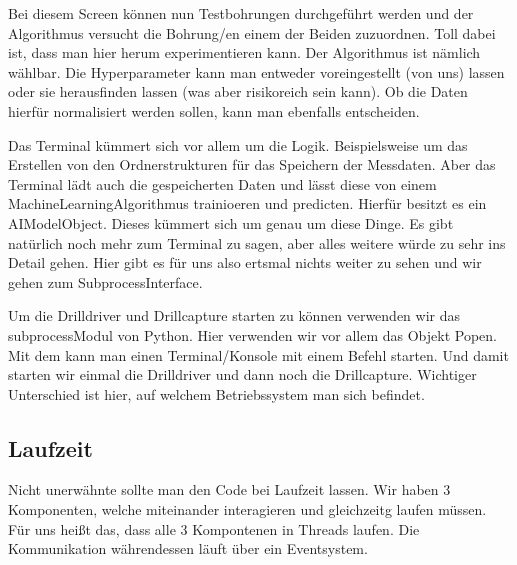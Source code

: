 \documentclass[letterpaper,10pt,english]{sphinxmanual}
\let\sphinxpxdimen\pdfpxdimen\else\newdimen\sphinxpxdimen
\begin{document}
\sphinxAtStartPar
Bei diesem Screen können nun Testbohrungen durchgeführt werden und der Algorithmus versucht die Bohrung/en einem der Beiden zuzuordnen. Toll dabei ist, dass man hier herum experimentieren kann. Der Algorithmus ist nämlich wählbar. Die Hyperparameter kann man entweder voreingestellt (von uns) lassen oder sie herausfinden lassen (was aber risikoreich sein kann). Ob die Daten hierfür normalisiert werden sollen, kann man ebenfalls entscheiden.

\sphinxAtStartPar
{}

\sphinxAtStartPar
Das Terminal kümmert sich vor allem um die Logik. Beispielsweise um das Erstellen von den Ordnerstrukturen für das Speichern der Messdaten.
Aber das Terminal lädt auch die gespeicherten Daten und lässt diese von einem Machine\sphinxhyphen{}Learning\sphinxhyphen{}Algorithmus trainioeren und predicten. Hierfür besitzt es ein AI\sphinxhyphen{}Model\sphinxhyphen{}Object. Dieses kümmert sich um genau um diese Dinge.
Es gibt natürlich noch mehr zum Terminal zu sagen, aber alles weitere würde zu sehr ins Detail gehen. Hier gibt es für uns also ertsmal nichts weiter zu sehen und wir gehen zum Subprocess\sphinxhyphen{}Interface.

\sphinxAtStartPar
{}

\sphinxAtStartPar
Um die Drilldriver und Drillcapture starten zu können verwenden wir das subprocess\sphinxhyphen{}Modul von Python. Hier verwenden wir vor allem das Objekt Popen. Mit dem kann man einen Terminal/Konsole mit einem Befehl starten. Und damit starten wir einmal die Drilldriver und dann noch die Drillcapture. Wichtiger Unterschied ist hier, auf welchem Betriebssystem man sich befindet.


\subsection{Laufzeit}
\label{\detokenize{explain:laufzeit}}
\sphinxAtStartPar
Nicht unerwähnte sollte man den Code bei Laufzeit lassen. Wir haben 3 Komponenten, welche miteinander interagieren und gleichzeitg laufen müssen. Für uns heißt das, dass alle 3 Kompontenen in Threads laufen. Die Kommunikation währendessen läuft über ein Eventsystem.

\noindent\sphinxincludegraphics[width=600\sphinxpxdimen]{{code_explanation_2}.jpg}
\end{document}
